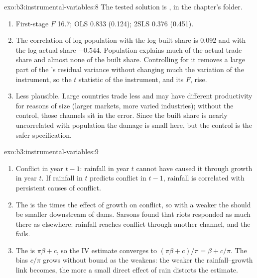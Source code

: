 \begin{solution}{exo:b3:instrumental-variables:8}
The tested solution is , in the chapter's
 folder.
\begin{enumerate}
\item First-stage $F$ 16.7; OLS 0.833 (0.124); 2SLS 0.376 (0.451).
\item The correlation of log population with the log built share is 0.092 and
with the log actual share $-0.544$. Population explains much of the actual
trade share and almost none of the built share. Controlling for it removes a
large part of the 's residual variance without changing much the
variation of the instrument, so the $t$ statistic of the instrument, and its
$F$, rise.
\item Less plausible. Large countries trade less and may have different
productivity for reasons of size (larger markets, more varied industries);
without the control, those channels sit in the error. Since the built share is
nearly uncorrelated with population the damage is small here, but the control
is the safer specification.
\end{enumerate}
\end{solution}

\begin{solution}{exo:b3:instrumental-variables:9}
\begin{enumerate}
\item Conflict in year $t - 1$: rainfall in year $t$ cannot have caused it
through growth in year $t$. If rainfall in $t$ predicts conflict in $t - 1$,
rainfall is correlated with persistent causes of conflict.
\item The  is the  times the effect of growth on
conflict, so with a weaker  the  should be smaller
downstream of dams. Sarsons found that riots responded as much there as
elsewhere: rainfall reaches conflict through another channel, and the
 fails.
\item The  is $\pi\beta + c$, so the IV estimate converges to
$(\pi\beta + c)/\pi = \beta + c/\pi$. The bias $c/\pi$ grows without bound as
the  weakens: the weaker the rainfall--growth link becomes, the more
a small direct effect of rain distorts the estimate.
\end{enumerate}
\end{solution}

